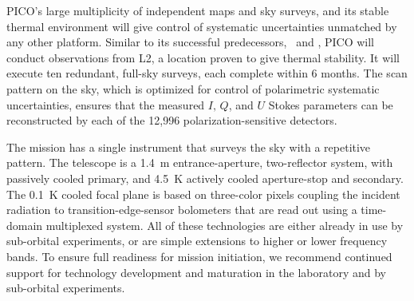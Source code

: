 \documentclass[PICOReport.tex]{subfiles}
\begin{document}
\afterpage{%
  \switchToLayoutPageB{}
    
   \clearpage
\switchToLayoutPageA{}
}


PICO's large multiplicity of independent maps and sky surveys, and its stable thermal environment will give control of systematic uncertainties unmatched by any other platform. Similar to its successful predecessors, \wmap\ and \planck , PICO will conduct observations from L2, a location proven to give thermal stability.  It will execute ten redundant,  full-sky surveys, each complete within 6 months. The scan pattern on the sky, which is optimized for control of polarimetric systematic uncertainties, ensures that the measured $I,\, Q$, and $U$ Stokes parameters can be reconstructed by each of the 12,996 polarization-sensitive detectors. 


The mission has a single instrument that surveys the sky with a repetitive pattern.  The telescope is a 1.4~m entrance-aperture, two-reflector system, with passively cooled primary, and 4.5~K actively cooled aperture-stop and secondary. The 0.1~K cooled focal plane is based on three-color pixels coupling the incident radiation to transition-edge-sensor bolometers that are read out using a time-domain multiplexed system. All of these technologies are either already in use by sub-orbital experiments, or are simple extensions to higher or lower frequency bands. To ensure full readiness for mission initiation, we recommend continued support for technology development and maturation in the laboratory and by sub-orbital experiments. 
\end{document}
